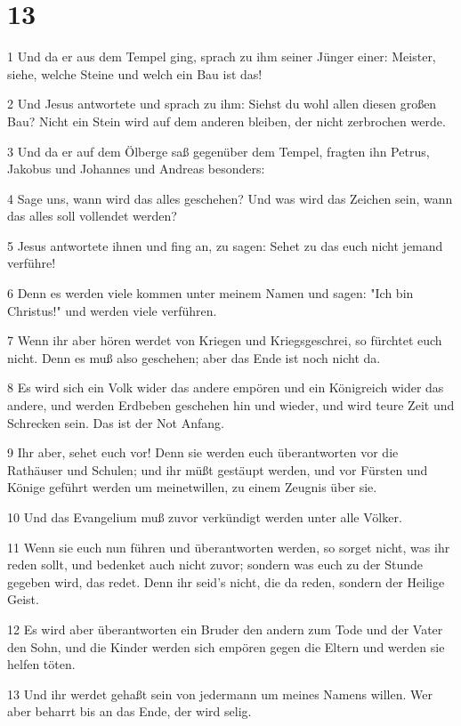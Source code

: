 \chapter{13}

\par 1 Und da er aus dem Tempel ging, sprach zu ihm seiner Jünger einer: Meister, siehe, welche Steine und welch ein Bau ist das!
\par 2 Und Jesus antwortete und sprach zu ihm: Siehst du wohl allen diesen großen Bau? Nicht ein Stein wird auf dem anderen bleiben, der nicht zerbrochen werde.
\par 3 Und da er auf dem Ölberge saß gegenüber dem Tempel, fragten ihn Petrus, Jakobus und Johannes und Andreas besonders:
\par 4 Sage uns, wann wird das alles geschehen? Und was wird das Zeichen sein, wann das alles soll vollendet werden?
\par 5 Jesus antwortete ihnen und fing an, zu sagen: Sehet zu das euch nicht jemand verführe!
\par 6 Denn es werden viele kommen unter meinem Namen und sagen: "Ich bin Christus!" und werden viele verführen.
\par 7 Wenn ihr aber hören werdet von Kriegen und Kriegsgeschrei, so fürchtet euch nicht. Denn es muß also geschehen; aber das Ende ist noch nicht da.
\par 8 Es wird sich ein Volk wider das andere empören und ein Königreich wider das andere, und werden Erdbeben geschehen hin und wieder, und wird teure Zeit und Schrecken sein. Das ist der Not Anfang.
\par 9 Ihr aber, sehet euch vor! Denn sie werden euch überantworten vor die Rathäuser und Schulen; und ihr müßt gestäupt werden, und vor Fürsten und Könige geführt werden um meinetwillen, zu einem Zeugnis über sie.
\par 10 Und das Evangelium muß zuvor verkündigt werden unter alle Völker.
\par 11 Wenn sie euch nun führen und überantworten werden, so sorget nicht, was ihr reden sollt, und bedenket auch nicht zuvor; sondern was euch zu der Stunde gegeben wird, das redet. Denn ihr seid's nicht, die da reden, sondern der Heilige Geist.
\par 12 Es wird aber überantworten ein Bruder den andern zum Tode und der Vater den Sohn, und die Kinder werden sich empören gegen die Eltern und werden sie helfen töten.
\par 13 Und ihr werdet gehaßt sein von jedermann um meines Namens willen. Wer aber beharrt bis an das Ende, der wird selig.
